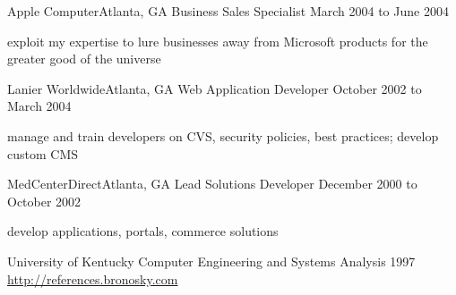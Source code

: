 \documentclass[10pt]{article}
\begin{document}
\sectionheader
{Apple Computer}{Atlanta, GA}
{Business Sales Specialist}
{March 2004 to June 2004}
\begin{longtext}
exploit my expertise to lure businesses away from Microsoft products for the greater good of the universe
\end{longtext}

\sectionheader
{Lanier Worldwide}{Atlanta, GA}
{Web Application Developer}
{October 2002 to March 2004}
\begin{longtext}
manage and train developers on CVS, security policies, best practices;
develop custom CMS
\end{longtext}

\sectionheader
{MedCenterDirect}{Atlanta, GA}
{Lead Solutions Developer}
{December 2000 to October 2002}
\begin{longtext}
develop applications, portals, commerce solutions
\end{longtext}


\sectionheader
{University of Kentucky}{}
{Computer Engineering and Systems Analysis}
{1997}
\fix
\halfskip
\href{http://references.bronosky.com}{http://references.bronosky.com}
\end{document}
